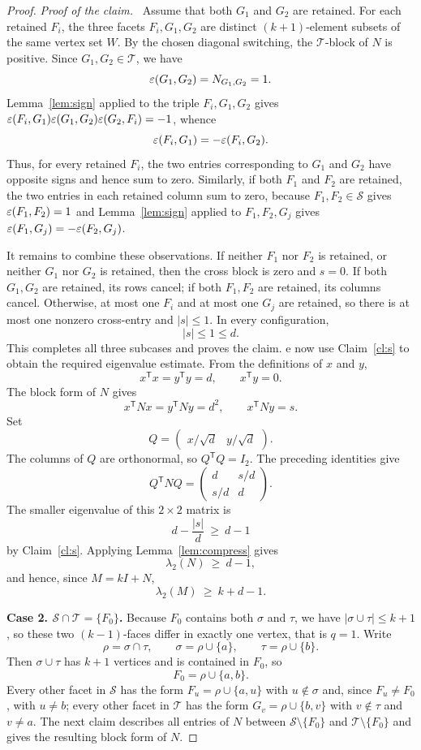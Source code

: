 \documentclass[10pt,a4paper]{amsart}
\newcommand{\Sset}{\mathcal S}
\newcommand{\T}{\mathsf{T}}
\newcommand{\Tset}{\mathcal T}
\newenvironment{claimproof}
  {\par\smallskip\noindent\textit{Proof of the claim.}\ }
\newcommand{\eps}{\varepsilon}
\begin{document}
\begin{proof}
\begin{claimproof}
Assume that both $G_1$ and $G_2$ are retained. For each retained $F_i$, the three facets
$F_i,G_1,G_2$ are distinct $(k+1)$-element subsets of the same vertex set $W$. By the chosen
diagonal switching, the $\Tset$-block of $N$ is positive. Since $G_1,G_2\in\Tset$, we have
\[
  \eps(G_1,G_2)=N_{G_1,G_2}=1 .
\]
Lemma~\ref{lem:sign} applied to the triple $F_i,G_1,G_2$ gives
$\eps(F_i,G_1)\eps(G_1,G_2)\eps(G_2,F_i)=-1$, whence
\[
  \eps(F_i,G_1)=-\eps(F_i,G_2) .
\]
Thus, for every retained $F_i$, the two entries corresponding to $G_1$ and $G_2$ have opposite
signs and hence sum to zero. Similarly, if both $F_1$ and $F_2$ are retained, the two entries
in each retained column sum to zero, because $F_1,F_2\in\Sset$ gives
$\eps(F_1,F_2)=1$ and Lemma~\ref{lem:sign} applied to $F_1,F_2,G_j$ gives
$\eps(F_1,G_j)=-\eps(F_2,G_j)$.

It remains to combine these observations. If neither $F_1$ nor $F_2$ is retained, or neither
$G_1$ nor $G_2$ is retained, then the cross block is zero and $s=0$. If both $G_1,G_2$ are
retained, its rows cancel; if both $F_1,F_2$ are retained, its columns cancel. Otherwise, at
most one $F_i$ and at most one $G_j$ are retained, so there is at most one nonzero cross-entry
and $|s|\le1$. In every configuration,
\[
  |s|\le1\le d .
\]
This completes all three subcases and proves the claim.
\end{claimproof}

We now use Claim~\ref{cl:s} to obtain the required eigenvalue estimate. From the definitions
of $x$ and $y$,
\[
  x^{\T}x=y^{\T}y=d,\qquad x^{\T}y=0 .
\]
The block form of $N$ gives
\[
  x^{\T}Nx=y^{\T}Ny=d^2,
  \qquad
  x^{\T}Ny=s .
\]
Set
\[
  Q=\begin{pmatrix}x/\sqrt d & y/\sqrt d\end{pmatrix} .
\]
The columns of $Q$ are orthonormal, so $Q^{\T}Q=I_2$. The preceding identities give
\[
  Q^{\T}NQ
  =\begin{pmatrix}
      d & s/d\\[2pt]
      s/d & d
    \end{pmatrix} .
\]
The smaller eigenvalue of this $2\times2$ matrix is
\[
  d-\frac{|s|}{d}\ \ge\ d-1
\]
by Claim~\ref{cl:s}. Applying Lemma~\ref{lem:compress} gives
\[
  \lambda_2(N)\ \ge\ d-1 ,
\]
and hence, since $M=kI+N$,
\[
  \lambda_2(M)\ \ge\ k+d-1 .
\]

\medskip
\noindent\textbf{Case 2. $\Sset\cap\Tset=\{F_0\}$.}
Because $F_0$ contains both $\sigma$ and $\tau$, we have $|\sigma\cup\tau|\le k+1$, so these two
$(k-1)$-faces differ in exactly one vertex, that is $q=1$. Write
\[
  \rho=\sigma\cap\tau,\qquad \sigma=\rho\cup\{a\},\qquad \tau=\rho\cup\{b\} .
\]
Then $\sigma\cup\tau$ has $k+1$ vertices and is contained in $F_0$, so
\[
  F_0=\rho\cup\{a,b\} .
\]
Every other facet in $\Sset$ has the form $F_u=\rho\cup\{a,u\}$ with $u\notin\sigma$ and, since
$F_u\ne F_0$, with $u\ne b$; every other facet in $\Tset$ has the form $G_v=\rho\cup\{b,v\}$
with $v\notin\tau$ and $v\ne a$. The next claim describes all entries of $N$ between
$\Sset\setminus\{F_0\}$ and $\Tset\setminus\{F_0\}$ and gives the resulting block form of $N$.


\end{proof}
\end{document}
